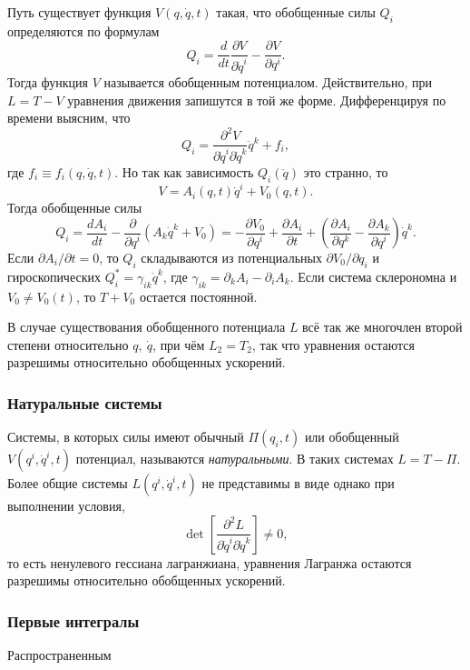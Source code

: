Путь существует функция $V (q, \dot{q}, t)$ такая, что обобщенные силы $Q_i$ определяются по формулам
\begin{equation*}
    Q_i = \frac{d }{d t} \frac{\partial V}{\partial \dot{q}^i} - \frac{\partial V}{\partial q^i}.
\end{equation*}
Тогда функция $V$ называется обобщенным потенциалом. Действительно, при $L = T - V$ уравнения движения запишутся в той же форме. Дифференцируя по времени выясним, что
\begin{equation*}
    Q_i = \frac{\partial^2 V}{\partial \dot{q}^i \partial \dot{q}^k} \ddot{q}^k + f_i,
\end{equation*}
где $f_i \equiv f_i ( q,\dot{q}, t)$. Но так как зависимость $Q_i(\ddot{q})$ это странно, то
\begin{equation*}
    V =  A_i(q, t) \dot{q}^i + V_0(q, t).
\end{equation*}
Тогда обобщенные силы
\begin{equation*}
    Q_i = \frac{d A_i}{d t} - \frac{\partial }{\partial q^i} \left(
        A_k \dot{q}^k  + V_0
    \right) = - \frac{\partial V_0}{\partial q^i} + \frac{\partial A_i}{\partial t} +
    \left(
        \frac{\partial A_i}{\partial q^k} - \frac{\partial A_k}{\partial q^i} 
    \right) \dot{q}^k.
\end{equation*}
Если $\partial A_i / \partial t = 0$, то $Q_i$ складываются из потенциальных $\partial V_0 / \partial q_i$ и гироскопических $Q_i^* = \gamma_{ik} \dot{q}^k$, где $\gamma_{ik} = \partial_k A_i - \partial_i A_k$. Если система склерономна и $V_0 \neq V_0(t)$, то $T+V_0$ остается постоянной.

В случае существования обобщенного потенциала $L$ всё так же многочлен второй степени относительно $q, \ \dot{q}$, при чём $L_2 = T_2$, так что уравнения остаются разрешимы относительно обобщенных ускорений.


\subsubsection*{Натуральные системы}


\begin{to_def} 
    Системы, в которых силы имеют обычный $\Pi(q_i, t)$ или обобщенный $V(q^i, \dot{q}^i, t)$ потенциал, называются \textit{натуральными}. В таких системах $L = T - \Pi$.
    Более общие системы $L(q^i, \dot{q}^i, t)$ не представимы в виде однако при выполнении условия, 
    \begin{equation*}
         \det \left[
            \frac{\partial^2 L}{\partial \dot{q}^i \partial \dot{q}^k} 
         \right] \neq 0,
    \end{equation*}
    то есть ненулевого гессиана лагранжиана, 
    уравнения Лагранжа остаются разрешимы относительно обобщенных ускорений.
\end{to_def}


\subsubsection*{Первые интегралы}

Распространенным    


